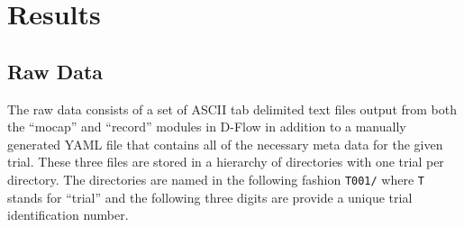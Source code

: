 \documentclass[fleqn,12pt]{wlpeerj}
\begin{document}
\section*{Results}
\subsection*{Raw Data}
%
The raw data consists of a set of ASCII tab delimited text files output from
both the ``mocap'' and ``record'' modules in D-Flow in addition to a manually
generated YAML file that contains all of the necessary meta data for the given
trial. These three files are stored in a hierarchy of directories with one
trial per directory. The directories are named in the following fashion
\verb+T001/+ where \verb+T+ stands for ``trial'' and the following three digits
are provide a unique trial identification number.
\end{document}
